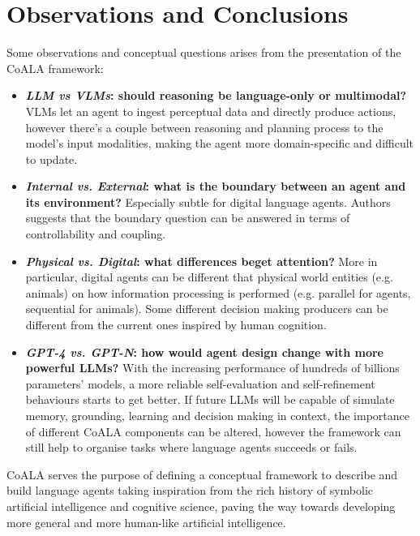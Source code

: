 \section{Observations and Conclusions}
Some observations and conceptual questions arises from the presentation
of the \ac{CoALA} framework:
\begin{itemize}
    \item \textbf{\emph{LLM vs VLMs}: should reasoning be language-only or
        multimodal?} VLMs let an agent to ingest perceptual data and directly
        produce actions, however there's a couple between reasoning and
        planning process to the model's input modalities, making the agent more
        domain-specific and difficult to update.
    \item \textbf{\emph{Internal vs. External}: what is the boundary between an
        agent and its environment?} Especially subtle for digital language agents.
        Authors suggests that the boundary question can be answered in terms of
        controllability and coupling.
    \item \textbf{\emph{Physical vs. Digital}: what differences beget
        attention?} More in particular, digital agents can be different that
        physical world entities (e.g. animals) on how information processing is
        performed (e.g. parallel for agents, sequential for animals). Some
        different decision making producers can be different from the current
        ones inspired by human cognition.

    \item \textbf{\emph{GPT-4 vs. GPT-N}: how would agent design change with
        more powerful LLMs?} With the increasing performance of hundreds of
        billions parameters' models, a more reliable self-evaluation and
        self-refinement behaviours starts to get better. If future LLMs will be
        capable of simulate memory, grounding, learning and decision making in
        context, the importance of different \ac{CoALA} components can be
        altered, however the framework can still help to organise tasks where
        language agents succeeds or fails.
\end{itemize}

\ac{CoALA} serves the purpose of defining a conceptual framework to describe
and build language agents taking inspiration from the rich history of symbolic
artificial intelligence and cognitive science, paving the way towards
developing more general and more human-like artificial intelligence.

